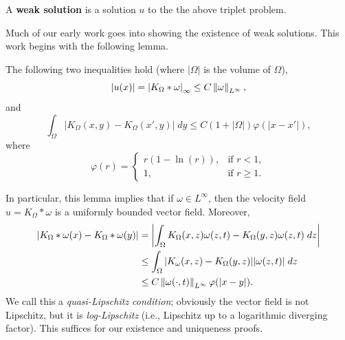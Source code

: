 \documentclass{article}
\begin{document}
\begin{definition}
	A \textbf{weak solution} is a solution $u$ to the the above triplet problem. 
\end{definition} 
Much of our early work goes into showing the existence of weak solutions. This work begins with the following lemma. 
\begin{lemma}
	The following two inequalities hold (where $|\Omega|$ is the volume of $\Omega$), 
	\begin{equation*}
		|u(x)| = \left| K_{\Omega}\ast\omega \right|_{\infty} \leq C\left\Vert \omega \right\Vert_{L^{\infty}}, 
	\end{equation*}
	and 
	\begin{equation*}
		\int_{\Omega}|K_{\Omega}(x, y) - K_{\Omega}(x',y)|\;dy \leq C(1+ |\Omega|)\varphi(|x - x'|), 
	\end{equation*} 
	where 
	\begin{equation*}
		\varphi(r) = 
		\begin{cases}
			r(1 - \ln(r)), & \text{if } r < 1, \\
			1, & \text{if } r \geq 1. 
		\end{cases}
	\end{equation*}
\end{lemma} 
In particular, this lemma implies that if $\omega \in L^{\infty}$, then the velocity field $u = K_{\Omega} \ast \omega$ is a uniformly bounded vector field. Moreover, 
\begin{align*}
	\begin{split}
		\left| K_{\Omega}\ast \omega(x) - K_{\Omega}\ast \omega(y) \right| &= \left| \int_{\Omega}K_{\Omega}(x,z)\omega(z,t) - K_{\Omega}(y,z)\omega(z,t)\;dz \right|\\
		&\leq \int_{\Omega}|K_{\omega}(x,z) - K_{\Omega}(y,z)||\omega(z,t)|\;dz \\
		&\leq C\left\Vert \omega(\cdot, t) \right\Vert_{L^{\infty}} \varphi(|x - y|). 
	\end{split} 
\end{align*}
We call this a \textit{quasi-Lipschitz condition}; obviously the vector field is not Lipschitz, but it is \textit{log-Lipschitz} (i.e., Lipschitz up to a logarithmic diverging factor). This suffices for our existence and uniqueness proofs. 
\end{document}
